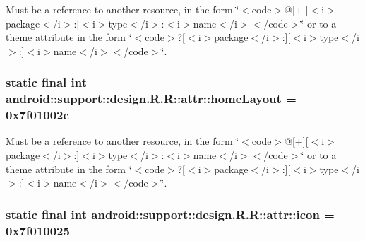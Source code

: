 Must be a reference to another resource, in the form \char`\"{}$<$code$>$@\mbox{[}+\mbox{]}\mbox{[}$<$i$>$package$<$/i$>$:\mbox{]}$<$i$>$type$<$/i$>$:$<$i$>$name$<$/i$>$$<$/code$>$\char`\"{} or to a theme attribute in the form \char`\"{}$<$code$>$?\mbox{[}$<$i$>$package$<$/i$>$:\mbox{]}\mbox{[}$<$i$>$type$<$/i$>$:\mbox{]}$<$i$>$name$<$/i$>$$<$/code$>$\char`\"{}. \hypertarget{classandroid_1_1support_1_1design_1_1_r_1_1attr_1555416a43f71009e9576c6633240755}{
\subsubsection[{homeLayout}]{\setlength{\rightskip}{0pt plus 5cm}static final int android::support::design.R.R::attr::homeLayout = 0x7f01002c}}
\label{classandroid_1_1support_1_1design_1_1_r_1_1attr_1555416a43f71009e9576c6633240755}


Must be a reference to another resource, in the form \char`\"{}$<$code$>$@\mbox{[}+\mbox{]}\mbox{[}$<$i$>$package$<$/i$>$:\mbox{]}$<$i$>$type$<$/i$>$:$<$i$>$name$<$/i$>$$<$/code$>$\char`\"{} or to a theme attribute in the form \char`\"{}$<$code$>$?\mbox{[}$<$i$>$package$<$/i$>$:\mbox{]}\mbox{[}$<$i$>$type$<$/i$>$:\mbox{]}$<$i$>$name$<$/i$>$$<$/code$>$\char`\"{}. \hypertarget{classandroid_1_1support_1_1design_1_1_r_1_1attr_ae4b0be5a953b9a7db957b59a75fad40}{
\subsubsection[{icon}]{\setlength{\rightskip}{0pt plus 5cm}static final int android::support::design.R.R::attr::icon = 0x7f010025}}
\label{classandroid_1_1support_1_1design_1_1_r_1_1attr_ae4b0be5a953b9a7db957b59a75fad40}


